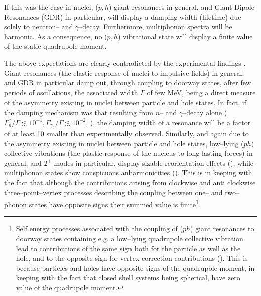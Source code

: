 \documentclass[a4paper,11pt]{article}
\numberwithin{equation}{section}
\numberwithin{figure}{section}
\numberwithin{table}{section}
\begin{document}
If this was the case in nuclei, ($p,h$) giant resonances in general, and Giant Dipole Resonances (GDR) in particular, will display a damping width (lifetime) due solely to neutron-- and $\gamma$--decay. Furthermore, multiphonon spectra will be harmonic. As a consequence, no ($p,h$) vibrational state will display a finite value of the static quadrupole moment.





The above expectations are clearly contradicted by the experimental findings \cite{Bohr:75,Soloviev:92,Bortignon:98}. Giant resonances (the elastic response of nuclei to impulsive fields) in general, and GDR in particular damp out, through coupling to doorway states, after few periods of oscillations, the associated width $\Gamma$ of few MeV, being a direct measure of the asymmetry existing in nuclei between particle and hole states. In fact, if the damping mechanism was that resulting from $n$-- and $\gamma$--decay alone ($\Gamma^\uparrow_n/\Gamma\lesssim10^{-1},\Gamma_{\gamma_0}/\Gamma\lesssim10^{-2}$, \cite{Aumann:98}), the damping width of a resonance will be a factor of at least 10 smaller than experimentally observed. Similarly, and again due to the asymmetry existing in nuclei between particle and hole states, low--lying ($ph$) collective vibrations (the plastic response of the nucleus to long lasting forces) in general, and $2^+$ modes in particular, display sizable reorientation effects (\cite{deBoer:68}), while multiphonon states show conspicuous anharmonicities (\cite{Bohr:75}). This is in keeping with the fact that although the contributions arising from clockwise and anti clockwise three--point--vertex processes describing the coupling between one-- and two-- phonon states have opposite signs their summed value is finite\footnote{Self energy processes associated with the coupling of ($ph$) giant resonances to doorway states containing e.g. a low--lying quadrupole collective vibration lead to contributions of the same sign both for the particle as well as the hole, and to the opposite sign for vertex correction contributions (\cite{Bortignon:83}). This is because particles and holes have opposite signs of the quadrupole moment, in keeping with the fact that  closed shell systems being spherical,  have zero value of the quadrupole moment.}.   
\end{document}
